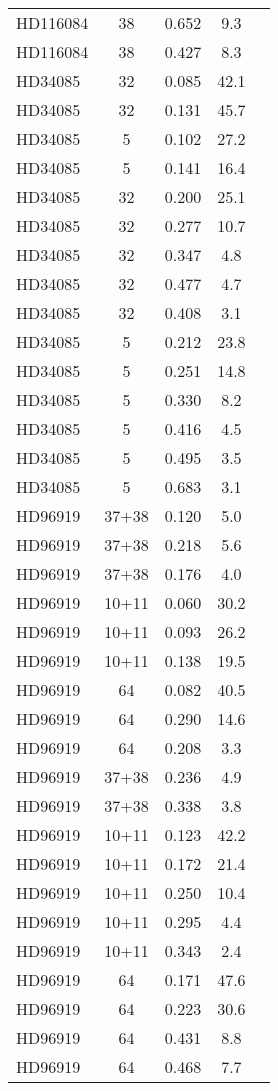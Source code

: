 \begin{table*}
\begin{tabular}{l c c c c}
HD116084 & 38 & 0.652 & 9.3\\ 
HD116084 & 38 & 0.427 & 8.3\\ 
\hline
HD34085 & 32 & 0.085 & 42.1\\ 
HD34085 & 32 & 0.131 & 45.7\\ 
HD34085 & 5 & 0.102 & 27.2\\ 
HD34085 & 5 & 0.141 & 16.4\\ 
HD34085 & 32 & 0.200 & 25.1\\ 
HD34085 & 32 & 0.277 & 10.7\\ 
HD34085 & 32 & 0.347 & 4.8\\ 
HD34085 & 32 & 0.477 & 4.7\\ 
HD34085 & 32 & 0.408 & 3.1\\ 
HD34085 & 5 & 0.212 & 23.8\\ 
HD34085 & 5 & 0.251 & 14.8\\ 
HD34085 & 5 & 0.330 & 8.2\\ 
HD34085 & 5 & 0.416 & 4.5\\ 
HD34085 & 5 & 0.495 & 3.5\\ 
HD34085 & 5 & 0.683 & 3.1\\ 
\hline
HD96919 & 37+38 & 0.120 & 5.0\\ 
HD96919 & 37+38 & 0.218 & 5.6\\ 
HD96919 & 37+38 & 0.176 & 4.0\\ 
HD96919 & 10+11 & 0.060 & 30.2\\ 
HD96919 & 10+11 & 0.093 & 26.2\\ 
HD96919 & 10+11 & 0.138 & 19.5\\ 
HD96919 & 64 & 0.082 & 40.5\\ 
HD96919 & 64 & 0.290 & 14.6\\ 
HD96919 & 64 & 0.208 & 3.3\\ 
HD96919 & 37+38 & 0.236 & 4.9\\ 
HD96919 & 37+38 & 0.338 & 3.8\\ 
HD96919 & 10+11 & 0.123 & 42.2\\ 
HD96919 & 10+11 & 0.172 & 21.4\\ 
HD96919 & 10+11 & 0.250 & 10.4\\ 
HD96919 & 10+11 & 0.295 & 4.4\\ 
HD96919 & 10+11 & 0.343 & 2.4\\ 
HD96919 & 64 & 0.171 & 47.6\\ 
HD96919 & 64 & 0.223 & 30.6\\ 
HD96919 & 64 & 0.431 & 8.8\\ 
HD96919 & 64 & 0.468 & 7.7\\ 

\end{tabular}
\end{table*}
